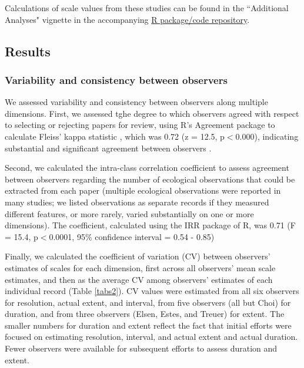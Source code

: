 \documentclass[12pt]{article}
\begin{document}
Calculations of scale values from these studies can be found in the ``Additional Analyses" vignette in the accompanying \href{https://github.com/agroimpacts/ecoscales}{R package/code repository}.

\subsection*{Results}
\vspace{-4pt}

\subsubsection*{Variability and consistency between observers}
\vspace{-10pt}

We assessed variability and consistency between observers along multiple dimensions. First, we assessed tghe degree to which observers agreed with respect to selecting or rejecting papers for review, using R's Agreement package \cite{yu_agreement:_2012} to calculate Fleiss' kappa statistic \cite{fleiss_measuring_1971}, which was 0.72 (z = 12.5, p$<$0.000), indicating substantial and significant agreement between observers \cite{landis_measurement_1977}. 

Second, we calculated the intra-class correlation coefficient \cite{bartko_intraclass_1966} to assess agreement between observers regarding the number of ecological observations that could be extracted from each paper (multiple ecological observations were reported in many studies; we listed observations as separate records if they measured different features, or more rarely, varied substantially on one or more dimensions).  The coefficient, calculated using the IRR package \cite{gamer_irr:_2012} of R, was 0.71 (F = 15.4, p$<$0.0001, 95\% confidence interval = 0.54 - 0.85)  

Finally, we calculated the coefficient of variation (CV) between observers' estimates of scales for each dimension, first across all observers' mean scale estimates, and then as the average CV among observers' estimates of each individual record (Table \ref{tabs2}). CV values were estimated from all six observers for resolution, actual extent, and interval, from five observers (all but Choi) for duration, and from three observers (Elsen, Estes, and Treuer) for extent. The smaller numbers for duration and extent reflect the fact that initial efforts were focused on estimating resolution, interval, and actual extent and actual duration. Fewer observers were available for subsequent efforts to assess duration and extent. 
\end{document}

